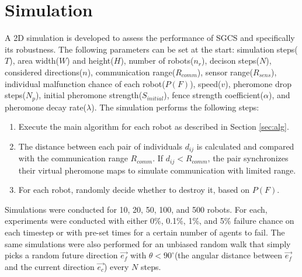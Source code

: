 \section{Simulation}
\label{sec:sim}
A 2D simulation is developed to assess the performance of SGCS and specifically its robustness. The following parameters can be set at the start: simulation steps($T$), area width($W$) and height($H$), number of robots($n_r$), decison steps($N$), considered directions($n$), communication range($R_{comm}$), sensor range($R_{sens}$), individual malfunction chance of each robot($P(F)$), speed($v$), pheromone drop steps($N_p$), initial pheromone strength($S_{initial}$), fence strength coefficient($\alpha$), and pheromone decay rate($\lambda$). 
The simulation performs the following steps:
\begin{enumerate}
	\item Execute the main algorithm for each robot as described in Section \ref{sec:alg}.
	\item The distance between each pair of individuals $d_{ij}$ is calculated and compared with the communication range $R_{comm}$. If $d_{ij}<R_{comm}$, the pair synchronizes their virtual pheromone maps to simulate communication with limited range.
	\item For each robot, randomly decide whether to destroy it, based on $P(F)$. 
\end{enumerate}
Simulations were conducted for 10, 20, 50, 100, and 500 robots. For each, experiments were conducted with either 0\%, 0.1\%, 1\%, and 5\% failure chance on each timestep or with pre-set times for a certain number of agents to fail.
The same simulations were also performed for an unbiased random walk that simply picks a random future direction $\vec{e_f}$  with $\theta < 90^{\circ}$(the angular distance between $\vec{e_f}$ and the current direction $\vec{e_c}$) every $N$ steps.
